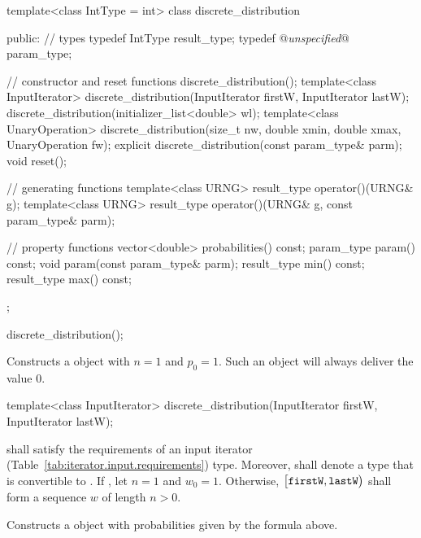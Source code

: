 \begin{codeblock}
template<class IntType = int>
 class discrete_distribution
{
public:
 // types
 typedef IntType result_type;
 typedef @\textit{unspecified}@ param_type;

 // constructor and reset functions
 discrete_distribution();
 template<class InputIterator>
   discrete_distribution(InputIterator firstW, InputIterator lastW);
 discrete_distribution(initializer_list<double> wl);
 template<class UnaryOperation>
   discrete_distribution(size_t nw, double xmin, double xmax, UnaryOperation fw);
 explicit discrete_distribution(const param_type& parm);
 void reset();

 // generating functions
 template<class URNG>
   result_type operator()(URNG& g);
 template<class URNG>
   result_type operator()(URNG& g, const param_type& parm);

 // property functions
 vector<double> probabilities() const;
 param_type param() const;
 void param(const param_type& parm);
 result_type min() const;
 result_type max() const;
};
\end{codeblock}

\begin{itemdecl}
discrete_distribution();
\end{itemdecl}

\begin{itemdescr}
\pnum\effects Constructs a  object
 with $ n = 1 $
 and $ p_0 = 1 $.
 \enternote
   Such an object will always deliver the value $0$.
 \exitnote
\end{itemdescr}


%
\begin{itemdecl}
template<class InputIterator>
  discrete_distribution(InputIterator firstW, InputIterator lastW);
\end{itemdecl}

\begin{itemdescr}
\pnum\requires
   shall satisfy the requirements
  of an input iterator (Table~\ref{tab:iterator.input.requirements}) type.
  Moreover,
  shall denote a type that is convertible to .
 If ,
 let $ n = 1 $
 and $ w_0 = 1 $.
 Otherwise,
 $\bigl[\texttt{firstW}, \texttt{lastW}\bigr)$
 shall form a sequence $w$ of length $n > 0$.

\pnum\effects Constructs a  object
 with probabilities given by the formula above.
\end{itemdescr}


